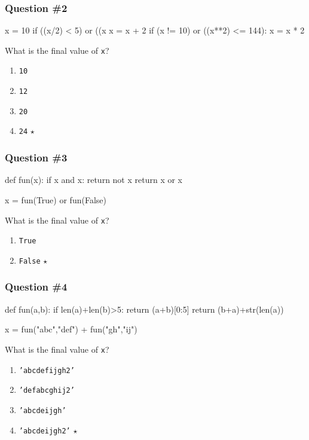 \documentclass[11pt]{beamer}
\begin{document}
\begin{frame}[fragile]
  \frametitle{Question \#2}
  \Enlarge

  \begin{semiverbatim}
x = 10
if ((x/2) < 5) or ((x%
    x = x + 2
if (x != 10) or ((x**2) <= 144):
    x = x * 2
  \end{semiverbatim}
  What is the final value of \texttt{x}?
  \begin{enumerate}[label=\Alph*]
  \item  \texttt{10}
  \item  \texttt{12}
  \item  \texttt{20}
  \item  \texttt{24}  $\star$
  \end{enumerate}
\end{frame}

\begin{frame}[fragile]
  \frametitle{Question \#3}
  \Enlarge

  \begin{semiverbatim}
def fun(x):
    if x and x:
        return not x
    return x or x

x = fun(True) or fun(False)
  \end{semiverbatim}
  What is the final value of \texttt{x}?
  \begin{enumerate}[label=\Alph*]
  \item  \texttt{True}
  \item  \texttt{False}  $\star$
  \end{enumerate}
\end{frame}

\begin{frame}[fragile]
  \frametitle{Question \#4}
  \Enlarge

  \begin{semiverbatim}
def fun(a,b):
    if len(a)+len(b)>5:
        return (a+b)[0:5]
  return (b+a)+str(len(a))

x = fun("abc","def") + fun("gh","ij")
  \end{semiverbatim}
  What is the final value of \texttt{x}?
  \begin{enumerate}[label=\Alph*]
  \item  \texttt{'abcdefijgh2'}
  \item  \texttt{'defabcghij2'}
  \item  \texttt{'abcdeijgh'}
  \item  \texttt{'abcdeijgh2'}  $\star$
  \end{enumerate}
\end{frame}
\end{document}
